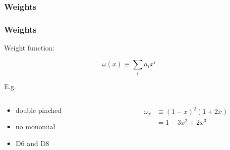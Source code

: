 \documentclass[fleqn]{beamer}
\begin{document}
\subsubsection{Weights}
\begin{frame}
  \frametitle{Weights}
  Weight function:
  \begin{ceqn}
    \begin{equation}
      \omega(x) \equiv \sum_i a_i x^i
    \end{equation}
  \end{ceqn}
  \vfill
  \makebox[\linewidth]{\rule{\textwidth}{1pt}}
  \vfill
  E.g.
  \begin{columns}
    \begin{column}{.3\textwidth}
      \begin{itemize}
        \item double pinched
        \item no monomial
        \item D6 and D8
      \end{itemize}
    \end{column}
    \begin{column}{.5\textwidth}
      \begin{equation}
        \begin{split}
          \omega_\tau &\equiv (1 - x)^2(1 + 2x) \\
          &= 1 - 3x^2 + 2x^3
        \end{split}
      \end{equation}
    \end{column}
  \end{columns}
\end{frame}
\end{document}
